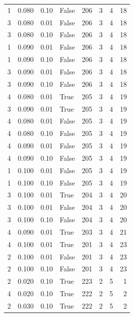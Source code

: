 \documentclass[a4paper,twoside,12pt]{book}
\begin{document}
\begin{table}
\begin{tabular}{rrrlrrrr}
				1 &  0.080 &     0.10 &    False &  206 &  3 &   4 &  18 \\
				3 &  0.080 &     0.01 &    False &  206 &  3 &   4 &  18 \\
				3 &  0.080 &     0.10 &    False &  206 &  3 &   4 &  18 \\
				1 &  0.090 &     0.01 &    False &  206 &  3 &   4 &  18 \\
				1 &  0.090 &     0.10 &    False &  206 &  3 &   4 &  18 \\
				3 &  0.090 &     0.01 &    False &  206 &  3 &   4 &  18 \\
				3 &  0.090 &     0.10 &    False &  206 &  3 &   4 &  18 \\
				4 &  0.080 &     0.01 &     True &  205 &  3 &   4 &  19 \\
				3 &  0.090 &     0.01 &     True &  205 &  3 &   4 &  19 \\
				4 &  0.080 &     0.01 &    False &  205 &  3 &   4 &  19 \\
				4 &  0.080 &     0.10 &    False &  205 &  3 &   4 &  19 \\
				4 &  0.090 &     0.01 &    False &  205 &  3 &   4 &  19 \\
				4 &  0.090 &     0.10 &    False &  205 &  3 &   4 &  19 \\
				1 &  0.100 &     0.01 &    False &  205 &  3 &   4 &  19 \\
				1 &  0.100 &     0.10 &    False &  205 &  3 &   4 &  19 \\
				3 &  0.100 &     0.01 &     True &  204 &  3 &   4 &  20 \\
				3 &  0.100 &     0.01 &    False &  204 &  3 &   4 &  20 \\
				3 &  0.100 &     0.10 &    False &  204 &  3 &   4 &  20 \\
				4 &  0.090 &     0.01 &     True &  203 &  3 &   4 &  21 \\
				4 &  0.100 &     0.01 &     True &  201 &  3 &   4 &  23 \\
				2 &  0.100 &     0.01 &    False &  201 &  3 &   4 &  23 \\
				2 &  0.100 &     0.10 &    False &  201 &  3 &   4 &  23 \\
				2 &  0.020 &     0.10 &     True &  223 &  2 &   5 &   1 \\
				4 &  0.020 &     0.10 &     True &  222 &  2 &   5 &   2 \\
				2 &  0.030 &     0.10 &     True &  222 &  2 &   5 &   2 \\

\end{tabular}
\end{table}
\end{document}
